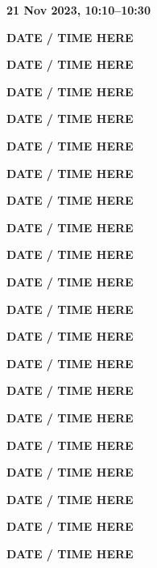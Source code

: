 \documentclass[12pt]{extbook}
\newcommand{\abstract}[2]{{
\begin{center}
\bfseries #1
\end{center}}
\par
}
\begin{document}
\clearpage





\abstract{21 Nov 2023, 10:10--10:30}{abstracts/Kipfer} %

\abstract{DATE / TIME HERE}{abstracts/Daskalopoulou} %
\abstract{DATE / TIME HERE}{abstracts/Kimani} %
\abstract{DATE / TIME HERE}{abstracts/Mtili} %

\abstract{DATE / TIME HERE}{abstracts/Roques}
\abstract{DATE / TIME HERE}{abstracts/Giroud}
\abstract{DATE / TIME HERE}{abstracts/Lightfoot}

\abstract{DATE / TIME HERE}{abstracts/Dutoit} %
\abstract{DATE / TIME HERE}{abstracts/Strauch_Zimmer} %
\abstract{DATE / TIME HERE}{abstracts/Finger} %




\abstract{DATE / TIME HERE}{abstracts/Tomonaga} %
\abstract{DATE / TIME HERE}{abstracts/Kim} %
\abstract{DATE / TIME HERE}{abstracts/vanLeeuw} %
\abstract{DATE / TIME HERE}{abstracts/Jacops} %


\abstract{DATE / TIME HERE}{abstracts/Engelhardt}
\abstract{DATE / TIME HERE}{abstracts/Picard}
\abstract{DATE / TIME HERE}{abstracts/Hillegonds}





\abstract{DATE / TIME HERE}{abstracts/Wang} %

\abstract{DATE / TIME HERE}{abstracts/Blanc} %

\abstract{DATE / TIME HERE}{abstracts/Brennwald} %

\abstract{DATE / TIME HERE}{abstracts/Currle} %
\end{document}
